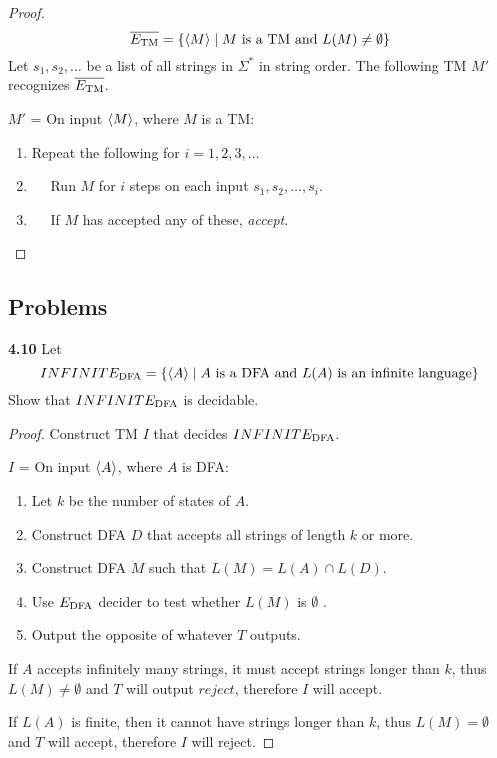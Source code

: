\begin{mdframed}
\begin{proof}
\[
\overline{E_{\text{TM}}} = \{\langle{M}\rangle \mid \text{$M$ is a TM and $L(M) \neq \emptyset$}\}
\]
Let $s_1, s_2, \ldots$ be a list of all strings in $\Sigma^*$ in string order. The following TM $M'$ recognizes $\overline{E_{\text{TM}}}$.

\medskip
$M'$ = On input $\langle{M}\rangle$, where $M$ is a TM:
\begin{enumerate}
\item Repeat the following for $i = 1, 2, 3, \ldots$
\item $\quad$ Run $M$ for $i$ steps on each input $s_1, s_2, \ldots, s_i$.
\item $\quad$ If $M$ has accepted any of these, \textit{accept}. 
\end{enumerate}
\end{proof}
\end{mdframed}

\subsection{Problems}

\label{lang:INFINITEDFA_DCDB}
\textbf{4.10} Let 
\[
INFINITE_{\text{DFA}} = \{\langle{A}\rangle \mid \text{$A$ is a DFA and $L(A)$ is an infinite language} \}
\]
Show that $INFINITE_{\text{DFA}}$ is decidable.

\begin{mdframed}
\begin{proof}
Construct TM $I$ that decides $INFINITE_{\text{DFA}}$.

\medskip
$I$ = On input $\langle{A}\rangle$, where $A$ is DFA:
\begin{enumerate}
\item Let $k$ be the number of states of $A$.
\item Construct DFA $D$ that accepts all strings of length $k$ or more.
\item Construct DFA $M$ such that $L(M) = L(A) \cap L(D)$.
\item Use $E_{\text{DFA}}$ decider to test whether $L(M)$ is $\emptyset$ .
\item Output the opposite of whatever $T$ outputs.
\end{enumerate}

If $A$ accepts infinitely many strings, it must accept strings longer than $k$, thus $L(M) \neq \emptyset$ and $T$ will output $reject$, therefore $I$ will accept.

If $L(A)$ is finite, then it cannot have strings longer than $k$, thus $L(M) = \emptyset$ and $T$ will accept, therefore $I$ will reject.
\end{proof}
\end{mdframed}

